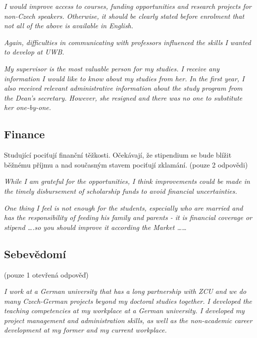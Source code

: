 \documentclass[
  czech,
  14pt,
  a4paper,
  DIV=11,
  numbers=noendperiod]{scrreprt}
\begin{document}
\emph{I would improve access to courses, funding opportunities and
research projects for non-Czech speakers. Otherwise, it should be
clearly stated before enrolment that not all of the above is available
in English.}

\emph{Again, difficulties in communicating with professors influenced
the skills I wanted to develop at UWB.}

\emph{My supervisor is the most valuable person for my studies. I
receive any information I would like to know about my studies from her.
In the first year, I also received relevant administrative information
about the study program from the Dean's secretary. However, she resigned
and there was no one to substitute her one-by-one.}

\subsection{Finance}\label{finance-1}

Studující pociťují finanční těžkosti. Očekávají, že stipendium se bude
blížit běžnému příjmu a nad současným stavem pociťují zklamání. (pouze 2
odpovědi)

\emph{While I am grateful for the opportunities, I think improvements
could be made in the timely disbursement of scholarship funds to avoid
financial uncertainties.}

\emph{One thing I feel is not enough for the students, especially who
are married and has the responsibility of feeding his family and parents
- it is financial coverage or stipend \ldots.so you should improve it
according the Market \ldots\ldots{} }

\subsection{Sebevědomí}\label{sebevux11bdomuxed}

(pouze 1 otevřená odpověď)

\emph{I work at a German university that has a long partnership with ZCU
and we do many Czech-German projects beyond my doctoral studies
together. I developed the teaching competencies at my workplace at a
German university. I developed my project management and administration
skills, as well as the non-academic career development at my former and
my current workplace.}
\end{document}
